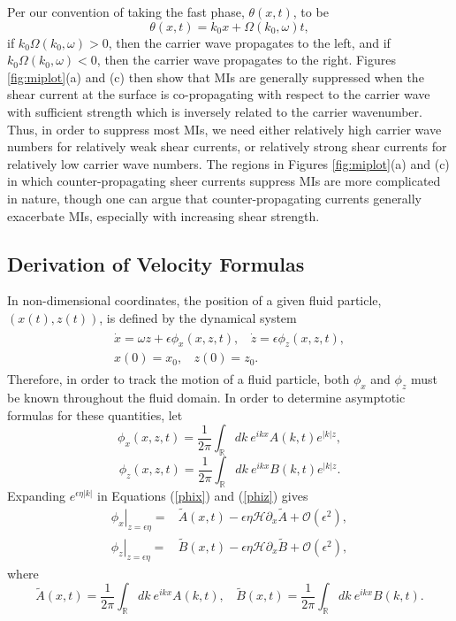 \documentclass{JFM_Style/jfm}
\newcommand{\pd}{\partial}
\begin{document}
Per our convention of taking the fast phase, $\theta(x,t)$, to be
\[
\theta(x,t) = k_{0}x + \Omega(k_{0},\omega) t,
\]
if $k_{0}\Omega(k_{0},\omega)>0$, then the carrier wave propagates to the left, and if $k_0 \Omega(k_{0},\omega)<0$, then the carrier wave propagates to the right.  Figures \ref{fig:miplot}(a) and (c) then show that MIs are generally suppressed when the shear current at the surface is co-propagating with respect to the carrier wave with sufficient strength which is inversely related to the carrier wavenumber.  Thus, in order to suppress most MIs, we need either relatively high carrier wave numbers for relatively weak shear currents, or relatively strong shear currents for relatively low carrier wave numbers.  The regions in Figures \ref{fig:miplot}(a) and (c) in which counter-propagating sheer currents suppress MIs are more complicated in nature, though one can argue that counter-propagating currents generally exacerbate MIs, especially with increasing shear strength.   
\subsection{Derivation of Velocity Formulas}
In non-dimensional coordinates, the position of a given fluid particle, $(x(t),z(t))$, is defined by the dynamical system
\begin{align}
\begin{split}
\dot{x} = \omega z + \epsilon \phi_{x}(x,z,t), ~~~~ \dot{z} = \epsilon\phi_{z}(x,z,t),\\
x(0) =x_0,~~~~ z(0)=z_0.
\end{split}
\label{system}
\end{align}
Therefore, in order to track the motion of a fluid particle, both $\phi_x$ and $\phi_z$ must be known throughout the fluid domain.  In order to determine asymptotic formulas for these quantities, let
\begin{equation}
\phi_{x}(x,z,t) = \frac{1}{2\pi}\int_{\mathbb{R}}dk~ e^{ikx} A(k,t)e^{|k|z},
\label{phix}
\end{equation}
\begin{equation}
\phi_{z}(x,z,t) = \frac{1}{2\pi}\int_{\mathbb{R}}dk~ e^{ikx} B(k,t)e^{|k|z}.
\label{phiz}
\end{equation}
Expanding $e^{\epsilon \eta |k|}$ in Equations (\ref{phix}) and (\ref{phiz}) gives
\begin{align}
\left.\phi_{x}\right|_{z=\epsilon\eta} = & \tilde{A}(x,t) - \epsilon\eta\mathcal{H}\pd_{x}\tilde{A} +\mathcal{O}(\epsilon^{2}),\label{phixsurfsol}\\
\left.\phi_{z}\right|_{z=\epsilon\eta} = & \tilde{B}(x,t) - \epsilon\eta\mathcal{H}\pd_{x}\tilde{B} +\mathcal{O}(\epsilon^{2}),\label{phizsurfsol}
\end{align}
where
\[
\tilde{A}(x,t) = \frac{1}{2\pi}\int_{\mathbb{R}}dk~ e^{ikx} A(k,t), ~~~~ \tilde{B}(x,t) = \frac{1}{2\pi}\int_{\mathbb{R}}dk~ e^{ikx} B(k,t).
\]
\end{document}
